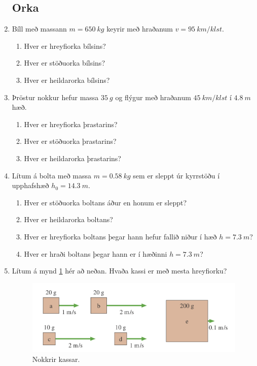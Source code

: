 \begin{enumerate}[label = \textbf{Dæmi \thechapter.\arabic*.}]

\subsection*{Orka}

\item Bíll með massann $m = \SI{650}{kg}$ keyrir með hraðanum $v = \SI{95}{km/klst}$.
\begin{enumerate}[label = \textbf{(\alph*)}]
    \item Hver er hreyfiorka bílsins?
    \item Hver er stöðuorka bílsins?
    \item Hver er heildarorka bílsins?
\end{enumerate}

\item Þröstur nokkur hefur massa $\SI{35}{g}$ og flýgur með hraðanum $\SI{45}{km/klst}$ í $\SI{4.8}{m}$ hæð.
\begin{enumerate}[label = \textbf{(\alph*)}]
    \item Hver er hreyfiorka þrastarins?
    \item Hver er stöðuorka þrastarins? 
    \item Hver er heildarorka þrastarins?
\end{enumerate}

\item Lítum á bolta með massa $m = \SI{0.58}{kg}$ sem er sleppt úr kyrrstöðu í upphafshæð $h_0 = \SI{14.3}{m}$.
\begin{enumerate}[label = \textbf{(\alph*)}]
    \item Hver er stöðuorka boltans áður en honum er sleppt?
    \item Hver er heildarorka boltans?
    \item Hver er hreyfiorka boltans þegar hann hefur fallið niður í hæð $h = \SI{7.3}{m}$?
    \item Hver er hraði boltans þegar hann er í hæðinni $h = \SI{7.3}{m}$?
\end{enumerate}

\item Lítum á mynd \ref{fig:sbrkassar} hér að neðan. Hvaða kassi er með mesta hreyfiorku?

\begin{figure}[H]
    \centering
    \includegraphics[scale = 0.3]{images/sbr.png}
    \caption{Nokkrir kassar.}
    \label{fig:sbrkassar}
\end{figure}


\end{enumerate}

